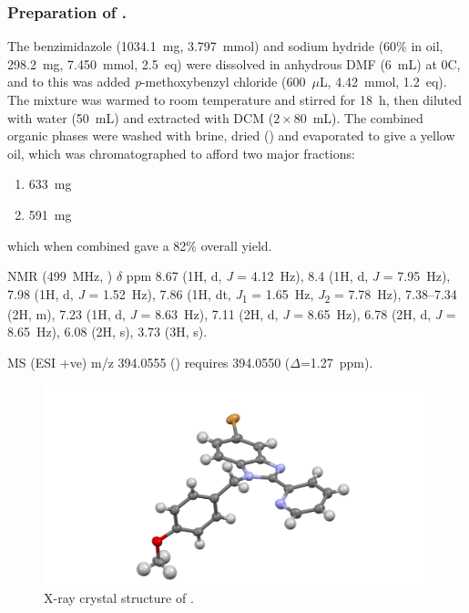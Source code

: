 \begin{refsection}
\subsubsection{Preparation of .}
The benzimidazole  (1034.1~mg, 3.797~mmol) and sodium hydride (60\% in oil, 298.2~mg, 7.450~mmol, 2.5~eq) were dissolved in anhydrous DMF (6~mL) at 0\degree C, and to this was added \textit{p}-methoxybenzyl chloride (600~$\mu$L, 4.42~mmol, 1.2~eq).
The mixture was warmed to room temperature and stirred for 18~h, then diluted with water (50~mL) and extracted with DCM ($2\times80$~mL).
The combined organic phases were washed with brine, dried () and evaporated to give a yellow oil, which was chromatographed to afford two major fractions:
\begin{enumerate}
    \item 633~mg
    \item 591~mg
\end{enumerate}
which when combined gave a 82\% overall yield.

 NMR (499~MHz, ) $\delta$ ppm 8.67 (1H, d, \emph{J} = 4.12~Hz), 8.4 (1H, d, \emph{J} = 7.95~Hz), 7.98 (1H, d, \emph{J} = 1.52~Hz), 7.86 (1H, dt, \emph{J}\textsubscript{1} = 1.65~Hz, \emph{J}\textsubscript{2} = 7.78~Hz), 7.38--7.34 (2H, m), 7.23 (1H, d, \emph{J} = 8.63~Hz), 7.11 (2H, d, \emph{J} = 8.65~Hz), 6.78 (2H, d, \emph{J} = 8.65~Hz), 6.08 (2H, s), 3.73 (3H, s).

MS (ESI +ve) m/z 394.0555 ()  requires 394.0550 ($\Delta$=1.27~ppm).

\begin{figure}
    \includegraphics[width=0.8\linewidth]{Figures/rhs-bromo-2py-pmb-xtal.pdf}
    \caption{X-ray crystal structure of .}
\end{figure}


\end{refsection}

